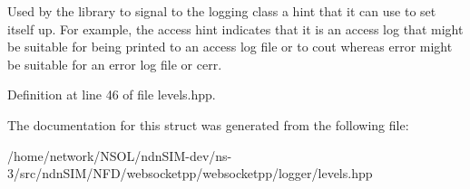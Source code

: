 Used by the library to signal to the logging class a hint that it can use to set itself up. For example, the {\ttfamily access} hint indicates that it is an access log that might be suitable for being printed to an access log file or to cout whereas {\ttfamily error} might be suitable for an error log file or cerr. 

Definition at line 46 of file levels.\+hpp.



The documentation for this struct was generated from the following file\+:\begin{DoxyCompactItemize}
\item 
/home/network/\+N\+S\+O\+L/ndn\+S\+I\+M-\/dev/ns-\/3/src/ndn\+S\+I\+M/\+N\+F\+D/websocketpp/websocketpp/logger/levels.\+hpp\end{DoxyCompactItemize}
